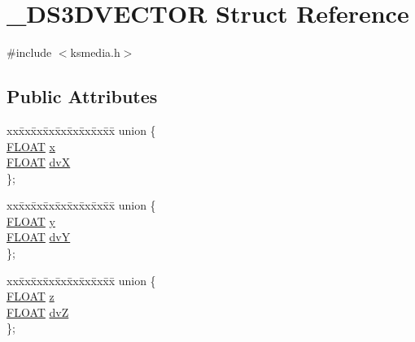 \hypertarget{struct___d_s3_d_v_e_c_t_o_r}{}\section{\+\_\+\+D\+S3\+D\+V\+E\+C\+T\+OR Struct Reference}
\label{struct___d_s3_d_v_e_c_t_o_r}


{\ttfamily \#include $<$ksmedia.\+h$>$}

\subsection*{Public Attributes}
\begin{DoxyCompactItemize}
\item 
\begin{tabbing}
xx\=xx\=xx\=xx\=xx\=xx\=xx\=xx\=xx\=\kill
union \{\\
\>\hyperlink{twolame_2libtwolame_2common_8h_ae8690abbffa85934d64d545920e2b108}{FLOAT} \hyperlink{struct___d_s3_d_v_e_c_t_o_r_a800656a73070d139ef42813d76cd47e5}{x}\\
\>\hyperlink{twolame_2libtwolame_2common_8h_ae8690abbffa85934d64d545920e2b108}{FLOAT} \hyperlink{struct___d_s3_d_v_e_c_t_o_r_acf808360eb7dfd60c535c22955b20b45}{dvX}\\
\}; \\

\end{tabbing}\item 
\begin{tabbing}
xx\=xx\=xx\=xx\=xx\=xx\=xx\=xx\=xx\=\kill
union \{\\
\>\hyperlink{twolame_2libtwolame_2common_8h_ae8690abbffa85934d64d545920e2b108}{FLOAT} \hyperlink{struct___d_s3_d_v_e_c_t_o_r_a56fe31ae21c62c2cb515c9a56993503d}{y}\\
\>\hyperlink{twolame_2libtwolame_2common_8h_ae8690abbffa85934d64d545920e2b108}{FLOAT} \hyperlink{struct___d_s3_d_v_e_c_t_o_r_a87d9c717a4e8f4e111ca938efd94f573}{dvY}\\
\}; \\

\end{tabbing}\item 
\begin{tabbing}
xx\=xx\=xx\=xx\=xx\=xx\=xx\=xx\=xx\=\kill
union \{\\
\>\hyperlink{twolame_2libtwolame_2common_8h_ae8690abbffa85934d64d545920e2b108}{FLOAT} \hyperlink{struct___d_s3_d_v_e_c_t_o_r_af5cc5b2fe7bc810dee1470e4d21752b1}{z}\\
\>\hyperlink{twolame_2libtwolame_2common_8h_ae8690abbffa85934d64d545920e2b108}{FLOAT} \hyperlink{struct___d_s3_d_v_e_c_t_o_r_a4d5087d5cb445f42ca5cffd5da708afa}{dvZ}\\
\}; \\

\end{tabbing}\end{DoxyCompactItemize}


